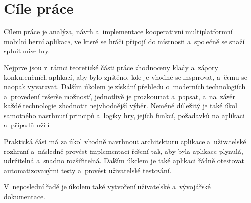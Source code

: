 \chapter{Cíle práce}
\label{chap:goals}

Cílem práce je analýza, návrh a~implementace
kooperativní multiplatformní mobilní herní aplikace,
ve které se hráči připojí do místnosti a~společně se snaží splnit mise hry.

Nejprve jsou v~rámci teoretické části práce zhodnoceny klady a~zápory
konkurenčních aplikací,
aby bylo zjištěno,
kde je vhodné se inspirovat, a~čemu se naopak vyvarovat.
Dalším úkolem je získání přehledu o~moderních technologiích
a~provedení rešerše možností, jednotlivě je prozkoumat a~popsat,
a~na~závěr každé technologie zhodnotit nejvhodnější výběr.
Neméně důležitý je také úkol samotného navrhnutí principů a~logiky hry,
jejích funkcí, požadavků na aplikaci a~případů užití.

Praktická část má za úkol vhodně navrhnout architekturu aplikace
a~uživatelské rozhraní a~následně provést implementaci řešení tak,
aby byla aplikace plynulá, udržitelná a~snadno rozšiřitelná.
Dalším úkolem je také aplikaci řádně otestovat automatizovanými testy 
a~provést uživatelské testování.

V~neposlední řadě je úkolem také vytvoření uživatelské a~vývojářské
dokumentace.
